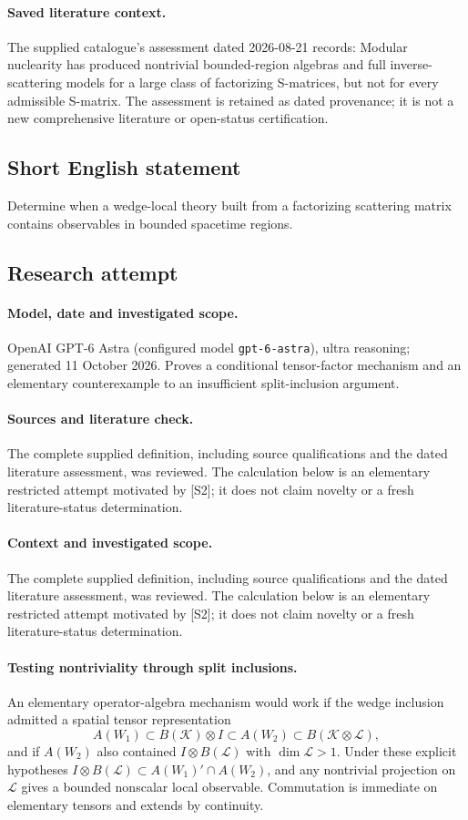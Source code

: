 \documentclass[11pt]{article}
\begin{document}
\paragraph{Saved literature context.} The supplied catalogue's assessment dated 2026-08-21 records: Modular nuclearity has produced nontrivial bounded-region algebras and full inverse-scattering models for a large class of factorizing S-matrices, but not for every admissible S-matrix. The assessment is retained as dated provenance; it is not a new comprehensive literature or open-status certification.
\subsection{Short English statement}
Determine when a wedge-local theory built from a factorizing scattering matrix contains observables in bounded spacetime regions.
\subsection{Research attempt}
\paragraph{Model, date and investigated scope.}
OpenAI GPT-6 Astra (configured model \texttt{gpt-6-astra}), ultra reasoning; generated 11 October 2026. Proves a conditional tensor-factor mechanism and an elementary counterexample to an insufficient split-inclusion argument.

\paragraph{Sources and literature check.}
The complete supplied definition, including source qualifications and the dated literature assessment, was reviewed. The calculation below is an elementary restricted attempt motivated by [S2]; it does not claim novelty or a fresh literature-status determination.

\paragraph{Context and investigated scope.} The complete supplied definition, including source qualifications and the dated literature assessment, was reviewed. The calculation below is an elementary restricted attempt motivated by [S2]; it does not claim novelty or a fresh literature-status determination.

\paragraph{Testing nontriviality through split inclusions.} An elementary operator-algebra mechanism would work if the wedge inclusion admitted a spatial tensor representation
\[
 A(W_1)\subset B(\mathcal K)\otimes I\subset A(W_2)\subset B(\mathcal K\otimes\mathcal L),
\]
and if $A(W_2)$ also contained $I\otimes B(\mathcal L)$ with $\dim\mathcal L>1$. Under these explicit hypotheses $I\otimes B(\mathcal L)\subset A(W_1)'\cap A(W_2)$, and any nontrivial projection on $\mathcal L$ gives a bounded nonscalar local observable. Commutation is immediate on elementary tensors and extends by continuity.
\end{document}
